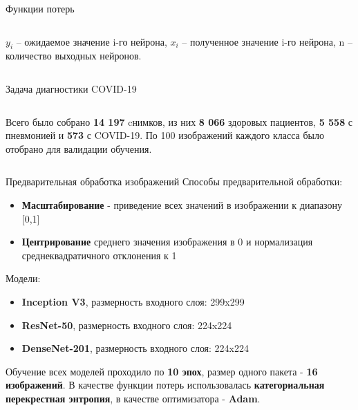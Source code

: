 \documentclass[aspectratio=169]{beamer}
\begin{document}
\begin{frame}{Функции потерь}
    
    \begin{columns}[T]
        \begin{column}{.8\paperwidth}
            $y_i$ – ожидаемое значение i-го нейрона, $x_i$ – полученное значение i-го нейрона, n – количество выходных нейронов.
        \end{column}
    \end{columns}   
\end{frame}

\begin{frame}{Задача диагностики COVID-19}
    \begin{columns}[T]
        \begin{column}{.8\paperwidth}            
            Всего было собрано \textbf{14 197} cнимков, из них \textbf{8 066} здоровых пациентов, \textbf{5 558} с пневмонией и \textbf{573} с COVID-19. По 100 изображений каждого класса было отобрано для валидации обучения.    
        \end{column}
    \end{columns}  
\end{frame}

\begin{frame}{Предварительная обработка изображений}
    Способы предварительной обработки:
    \begin{itemize}    
        \item \textbf{Масштабирование} - приведение всех значений в изображении к диапазону [0,1]
        \item \textbf{Центрирование} среднего значения изображения в 0 и нормализация среднеквадратичного отклонения к 1
    \end{itemize}    
    Модели:
    \begin{itemize}
        \item \textbf{Inception V3}, размерность входного слоя: 299x299
        \item \textbf{ResNet-50}, размерность входного слоя: 224x224
        \item \textbf{DenseNet-201}, размерность входного слоя:  224x224
    \end{itemize} 
    Обучение всех моделей проходило по \textbf{10 эпох}, размер одного пакета - \textbf{16 изображений}. В качестве функции потерь использовалась \textbf{категориальная перекрестная энтропия}, в качестве оптимизатора - \textbf{Adam}. 
\end{frame}
\end{document}
